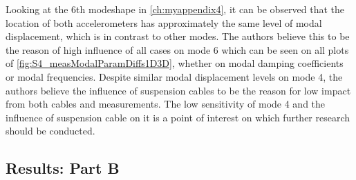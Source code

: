 Looking at the 6th modeshape in \cref{ch:myappendix4}, it can be observed that the location of both accelerometers has approximately the same level of modal displacement, which is in contrast to other modes. The authors believe this to be the reason of high influence of all cases on mode 6 which can be seen on all plots of \cref{fig:S4_measModalParamDiffs1D3D}, whether on modal damping coefficients or modal frequencies. Despite similar modal displacement levels on mode 4, the authors believe the influence of suspension cables to be the reason for low impact from both cables and measurements. The low sensitivity of mode 4 and the influence of suspension cable on it is a point of interest on which further research should be conducted.

\subsection{Results: Part B}


